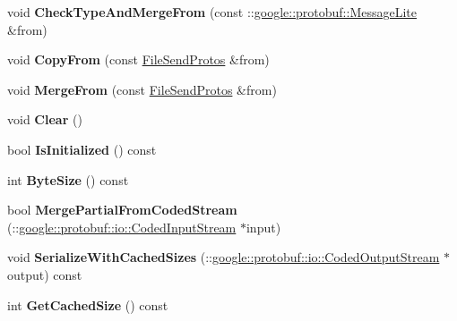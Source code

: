\begin{DoxyCompactItemize}
void {\bfseries Check\+Type\+And\+Merge\+From} (const \+::\hyperlink{classgoogle_1_1protobuf_1_1MessageLite}{google\+::protobuf\+::\+Message\+Lite} \&from)
\item 
\mbox{\label{classruntime_1_1FileSendProtos_a4684f10ce66fb855d89e494c0d1f0cde}} 
void {\bfseries Copy\+From} (const \hyperlink{classruntime_1_1FileSendProtos}{File\+Send\+Protos} \&from)
\item 
\mbox{\label{classruntime_1_1FileSendProtos_a656829a69edfda060e556a8c8ef8e50d}} 
void {\bfseries Merge\+From} (const \hyperlink{classruntime_1_1FileSendProtos}{File\+Send\+Protos} \&from)
\item 
\mbox{\label{classruntime_1_1FileSendProtos_a9c40bad1405c3b41433409ba4a7f302e}} 
void {\bfseries Clear} ()
\item 
\mbox{\label{classruntime_1_1FileSendProtos_a57a59f457a540da77a5b167a86489486}} 
bool {\bfseries Is\+Initialized} () const
\item 
\mbox{\label{classruntime_1_1FileSendProtos_ac11c92481ff9e358556509a06352def6}} 
int {\bfseries Byte\+Size} () const
\item 
\mbox{\label{classruntime_1_1FileSendProtos_a541871d79b6dd8aa778f00057e098798}} 
bool {\bfseries Merge\+Partial\+From\+Coded\+Stream} (\+::\hyperlink{classgoogle_1_1protobuf_1_1io_1_1CodedInputStream}{google\+::protobuf\+::io\+::\+Coded\+Input\+Stream} $\ast$input)
\item 
\mbox{\label{classruntime_1_1FileSendProtos_acb7fd1690f7142d32741fa742cdc2eed}} 
void {\bfseries Serialize\+With\+Cached\+Sizes} (\+::\hyperlink{classgoogle_1_1protobuf_1_1io_1_1CodedOutputStream}{google\+::protobuf\+::io\+::\+Coded\+Output\+Stream} $\ast$output) const
\item 
\mbox{\label{classruntime_1_1FileSendProtos_ae7f33111c537389f9d31f4171348592a}} 
int {\bfseries Get\+Cached\+Size} () const
\item 
\mbox{\label{classruntime_1_1FileSendProtos_aaf425f5001e8f8f99258516df42f597b}} 

\end{DoxyCompactItemize}
